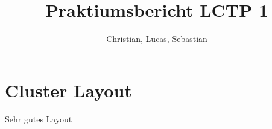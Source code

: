 \documentclass[zihtitle,german,plainreport,hyperref,utf8]{zihpub}
\author{Christian, Lucas, Sebastian}
\title{Praktiumsbericht LCTP 1}
\begin{document}
\chapter{Cluster Layout}
Sehr gutes Layout
\end{document}
